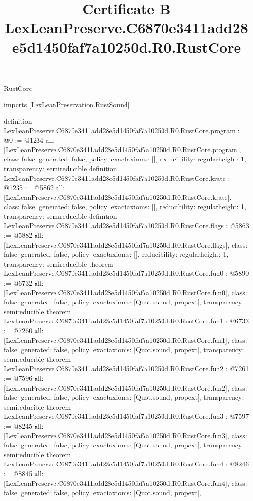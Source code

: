 \begin{lexlean}{RustCore}
\title{Certificate B LexLeanPreserve.C6870e3411add28e5d1450faf7a10250d.R0.RustCore}
\begin{coremodule}
imports [LexLeanPreservation.RustSound]

definition LexLeanPreserve.C6870e3411add28e5d1450faf7a10250d.R0.RustCore.program : @0 := @1234 {
  all: [LexLeanPreserve.C6870e3411add28e5d1450faf7a10250d.R0.RustCore.program],
  class: false,
  generated: false,
  policy: exact{axioms: []},
  reducibility: regular{height: 1},
  transparency: semireducible
}
definition LexLeanPreserve.C6870e3411add28e5d1450faf7a10250d.R0.RustCore.krate : @1235 := @5862 {
  all: [LexLeanPreserve.C6870e3411add28e5d1450faf7a10250d.R0.RustCore.krate],
  class: false,
  generated: false,
  policy: exact{axioms: []},
  reducibility: regular{height: 1},
  transparency: semireducible
}
definition LexLeanPreserve.C6870e3411add28e5d1450faf7a10250d.R0.RustCore.flags : @5863 := @5882 {
  all: [LexLeanPreserve.C6870e3411add28e5d1450faf7a10250d.R0.RustCore.flags],
  class: false,
  generated: false,
  policy: exact{axioms: []},
  reducibility: regular{height: 1},
  transparency: semireducible
}
theorem LexLeanPreserve.C6870e3411add28e5d1450faf7a10250d.R0.RustCore.fun0 : @5890 := @6732 {
  all: [LexLeanPreserve.C6870e3411add28e5d1450faf7a10250d.R0.RustCore.fun0],
  class: false,
  generated: false,
  policy: exact{axioms: [Quot.sound, propext]},
  transparency: semireducible
}
theorem LexLeanPreserve.C6870e3411add28e5d1450faf7a10250d.R0.RustCore.fun1 : @6733 := @7260 {
  all: [LexLeanPreserve.C6870e3411add28e5d1450faf7a10250d.R0.RustCore.fun1],
  class: false,
  generated: false,
  policy: exact{axioms: [Quot.sound, propext]},
  transparency: semireducible
}
theorem LexLeanPreserve.C6870e3411add28e5d1450faf7a10250d.R0.RustCore.fun2 : @7261 := @7596 {
  all: [LexLeanPreserve.C6870e3411add28e5d1450faf7a10250d.R0.RustCore.fun2],
  class: false,
  generated: false,
  policy: exact{axioms: [Quot.sound, propext]},
  transparency: semireducible
}
theorem LexLeanPreserve.C6870e3411add28e5d1450faf7a10250d.R0.RustCore.fun3 : @7597 := @8245 {
  all: [LexLeanPreserve.C6870e3411add28e5d1450faf7a10250d.R0.RustCore.fun3],
  class: false,
  generated: false,
  policy: exact{axioms: [Quot.sound, propext]},
  transparency: semireducible
}
theorem LexLeanPreserve.C6870e3411add28e5d1450faf7a10250d.R0.RustCore.fun4 : @8246 := @8845 {
  all: [LexLeanPreserve.C6870e3411add28e5d1450faf7a10250d.R0.RustCore.fun4],
  class: false,
  generated: false,
  policy: exact{axioms: [Quot.sound, propext]},
}
\end{coremodule}
\end{lexlean}
